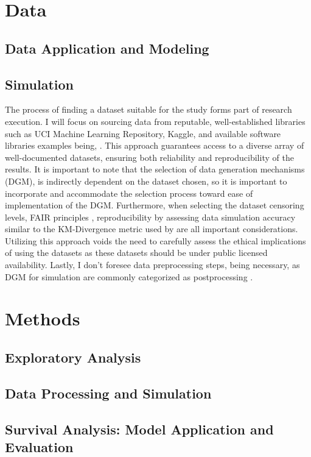 \section{Data}
\subsection{Data Application and Modeling}
\subsection{Simulation}
\noindent The process of finding a dataset suitable for the study forms part of research execution. I will focus on sourcing data from reputable, well-established libraries such as UCI Machine Learning Repository, Kaggle, and available software libraries examples being, \parencite{nagpal_auton-survival_2022} \parencite{davidson-pilon_lifelines_2024} \parencite{sebastian_polsterl_scikit-survival_2023}. This approach guarantees access to a diverse array of well-documented datasets, ensuring both reliability and reproducibility of the results. It is important to note that the selection of data generation mechanisms (DGM), is indirectly dependent on the dataset chosen, so it is important to incorporate and accommodate the selection process toward ease of implementation of the DGM. Furthermore, when selecting the dataset censoring levels, FAIR principles \parencite{wilkinson_fair_2016}, reproducibility by assessing data simulation accuracy similar to the KM-Divergence metric used by \parencite{norcliffe_survivalgan_2023} are all important considerations. Utilizing this approach voids the need to carefully assess the ethical implications of using the datasets as these datasets should be under public licensed availability. Lastly, I don't foresee data preprocessing steps, being necessary, as DGM for simulation are commonly categorized as postprocessing \parencite{jin_imputation_2024}. 

\section{Methods} \label{methods}
\subsection{Exploratory Analysis}
\subsection{Data Processing and Simulation}
\subsection{Survival Analysis: Model Application and Evaluation}
